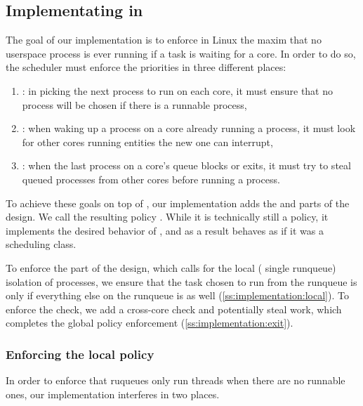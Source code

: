 \subsection{Implementating \beclass{} in \schedbe{}}

The goal of our implementation is to enforce in Linux the maxim that no
\beclass{} userspace process is ever running if a \normalclass{} task is waiting
for a core. In order to do so, the scheduler must enforce the priorities in
three different places:
\begin{enumerate}
    \item \local: in picking the next process to run on each core, it must ensure
        that no \beclass{} process will be chosen if there is a runnable
        \normalclass{} process,
    \item \entry: when waking up a \normalclass{} process on a core already
        running a \normalclass{} process, it must look for other cores running
        \beclass{} entities the new one can interrupt,
    \item \exit: when the last \normalclass{} process on a core's queue blocks
        or exits, it must try to steal queued \normalclass{} processes from
        other cores before running a \beclass{} process.
\end{enumerate}

To achieve these goals on top of \schedidle{}, our implementation adds the
\local{} and \exit{} parts of the \beclass{} design. We call the resulting
policy \schedbe{}. While it is technically still a policy, it implements the
desired behavior of \beclass{}, and as a result behaves as if it was a
scheduling class.

To enforce the \local{} part of the design, which calls for the local (\ie{}
single runqueue) isolation of \schedbe{} processes, we ensure that the task
chosen to run from the runqueue is only \schedbe{} if everything else on the
runqueue is as well (\autoref{ss:implementation:local}). To enforce the \exit{}
check, we add a cross-core check and potentially steal work, which completes the
global policy enforcement (\autoref{ss:implementation:exit}).

\subsubsection{Enforcing the local policy}\label{ss:implementation:local}

In order to enforce that ruqueues only run \schedbe{} threads when there are no
runnable \schednormal{} ones, our implementation interferes in two places. 

